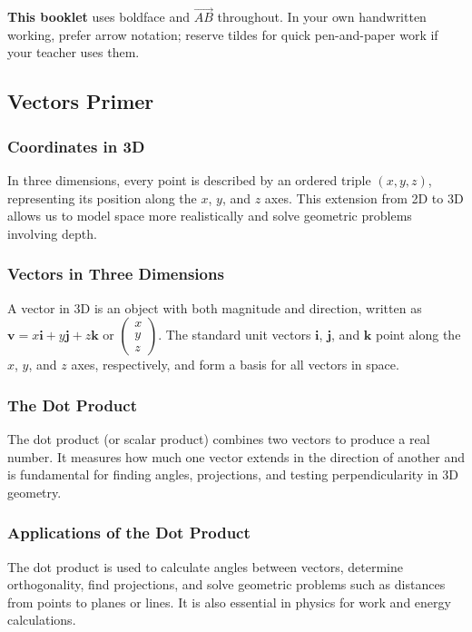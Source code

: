 \documentclass[12pt]{article}
\begin{document}
\vspace{0.2em}
\noindent\textbf{This booklet} uses boldface and $\overrightarrow{AB}$ throughout. In your own handwritten working, prefer arrow notation; reserve tildes for quick pen-and-paper work if your teacher uses them.

\subsection{Vectors Primer}

\subsubsection{Coordinates in 3D}
In three dimensions, every point is described by an ordered triple $(x, y, z)$, representing its position along the $x$, $y$, and $z$ axes. This extension from 2D to 3D allows us to model space more realistically and solve geometric problems involving depth.

\subsubsection{Vectors in Three Dimensions}
A vector in 3D is an object with both magnitude and direction, written as $\mathbf{v} = x\mathbf{i} + y\mathbf{j} + z\mathbf{k}$ or $\begin{pmatrix} x \\ y \\ z \end{pmatrix}$. The standard unit vectors $\mathbf{i}$, $\mathbf{j}$, and $\mathbf{k}$ point along the $x$, $y$, and $z$ axes, respectively, and form a basis for all vectors in space.

\subsubsection{The Dot Product}
The dot product (or scalar product) combines two vectors to produce a real number. It measures how much one vector extends in the direction of another and is fundamental for finding angles, projections, and testing perpendicularity in 3D geometry.

\subsubsection{Applications of the Dot Product}
The dot product is used to calculate angles between vectors, determine orthogonality, find projections, and solve geometric problems such as distances from points to planes or lines. It is also essential in physics for work and energy calculations.
\end{document}
